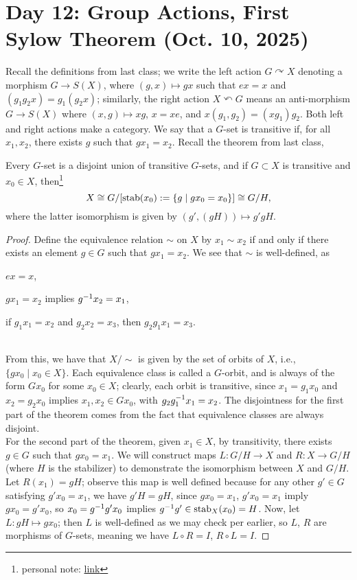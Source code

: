 \section{Day 12: Group Actions, First Sylow Theorem (Oct. 10, 2025)}
Recall the definitions from last class; we write the left action $G \curvearrowright X$ denoting a morphism $G \to S(X)$, where $(g, x) \mapsto gx$ such that $ex = x$ and $(g_1g_2x) = g_1(g_2x)$; similarly, the right action $X \curvearrowleft G$ means an anti-morphism $G \to S(X)$ where $(x, g) \mapsto xg$, $x = xe$, and $x(g_1, g_2) = (xg_1) g_2$. Both left and right actions make a category. We say that a $G$-set is transitive if, for all $x_1, x_2$, there exists $g$ such that $gx_1 = x_2$. Recall the theorem from last class,
\begin{theorem}
    Every $G$-set is a disjoint union of transitive $G$-sets, and if $G \subset X$ is transitive and $x_0 \in X$, then\footnote{personal note: \href{https://mathworld.wolfram.com/G-Set.html}{link}}
    \[ X \cong G/[\operatorname{stab}(x_0) := \{g \mid gx_0 = x_0\}] \cong G/H, \]
    where the latter isomorphism is given by $(g', (gH)) \mapsto g'gH$.
\end{theorem}
\begin{proof}
    Define the equivalence relation $\sim$ on $X$ by $x_1 \sim x_2$ if and only if there exists an element $g \in G$ such that $gx_1 = x_2$. We see that $\sim$ is well-defined, as \begin{parlist} \item $ex = x$, \item $gx_1 = x_2$ implies $g^{-1} x_2 = x_1$, \item if $g_1x_1 = x_2$ and $g_2x_2 = x_3$, then $g_2g_1x_1 = x_3$. \end{parlist}
    \\[8pt]
    From this, we have that $X/\sim$ is given by the set of orbits of $X$, i.e., $\{gx_0 \mid x_0 \in X\}$. Each equivalence class is called a $G$-orbit, and is always of the form $Gx_0$ for some $x_0 \in X$; clearly, each orbit is transitive, since $x_1 = g_1x_0$ and $x_2 = g_2x_0$ implies $x_1, x_2 \in Gx_0$, with $g_2g_1^{-1} x_1 = x_2$. The disjointness for the first part of the theorem comes from the fact that equivalence classes are always disjoint.
    \\[8pt]
    For the second part of the theorem, given $x_1 \in X$, by transitivity, there exists $g \in G$ such that $gx_0 = x_1$. We will construct maps $L : G/H \to X$ and $R : X \to G/H$ (where $H$ is the stabilizer) to demonstrate the isomorphism between $X$ and $G/H$. Let $R(x_1) = gH$; observe this map is well defined because for any other $g' \in G$ satisfying $g'x_0 = x_1$, we have $g'H = gH$, since $gx_0 = x_1$, $g'x_0 = x_1$ imply $gx_0 = g'x_0$, so $x_0 = g^{-1} g'x_0$ implies $g^{-1} g' \in \operatorname{stab}_X(x_0) = H$. Now, let $L : gH \mapsto gx_0$; then $L$ is well-defined as we may check per earlier, so $L$, $R$ are morphisms of $G$-sets, meaning we have $L \circ R = I$, $R \circ L = I$.
\end{proof}
